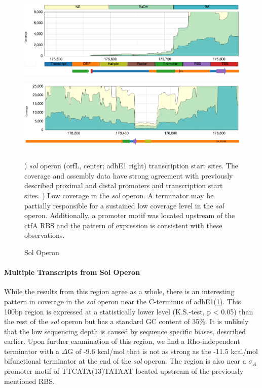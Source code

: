 \begin{figure}
\small
{\includegraphics[width=\textwidth,height=1.5in]{images/Assembly/Examples/Sol/Sol-TSS.png}
\label{fig:5.11a}}
{\includegraphics[width=\textwidth,height=1.5in]{images/Assembly/Examples/Sol/AdhE-terminator.png}
\label{fig:5.11b}}
\caption{Sol Operon}
) \textit{sol} operon (orfL, center; adhE1 right) transcription start sites. The coverage and assembly data have strong agreement with previously described proximal and distal promoters and transcription start sites. ) Low coverage in the \textit{sol} operon. A terminator may be partially responsible for a sustained low coverage level in the \textit{sol} operon. Additionally, a promoter motif was located upstream of the ctfA RBS and the pattern of expression is consistent with these observations.
\end{figure}

\paragraph{Multiple Transcripts from Sol Operon}
While the results from this region agree as a whole, there is an interesting pattern in coverage in the \textit{sol} operon near the C-terminus of adhE1(\ref{fig:5.11b}). This 100bp region is expressed at a statistically lower level (K.S.-test, p < 0.05) than the rest of the \textit{sol} operon but has a standard GC content of 35\%. It is unlikely that the low sequencing depth is caused by sequence specific biases, described earlier. Upon further examination of this region, we find a Rho-independent terminator with a \(\Delta\)G of -9.6 kcal/mol that is not as strong as the -11.5 kcal/mol bifunctional terminator at the end of the \textit{sol} operon. The region is also near a $\sigma_{A}$ promoter motif of TTCATA(13)TATAAT located upstream of the previously mentioned RBS. 

